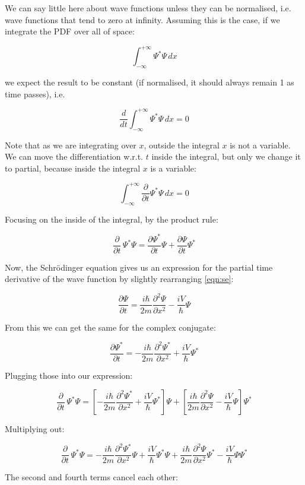 We can say little here about wave functions unless they can be normalised, i.e. wave functions that tend to zero at infinity. Assuming this is the case, if we integrate the PDF over all of space:

$$
\int_{-\infty}^{+\infty}
\Psi^*\Psi
\,dx
$$

we expect the result to be constant (if normalised, it should always remain 1 as time passes), i.e.

$$
\frac{d}{d t}
\int_{-\infty}^{+\infty}
\Psi^*\Psi
\,dx
= 0
$$

Note that as we are integrating over $x$, outside the integral $x$ is not a variable. We can move the differentiation w.r.t. $t$ inside the integral, but only we change it to partial, because inside the integral $x$ is a variable:

$$
\int_{-\infty}^{+\infty}
\frac{\partial}{\partial t}
\Psi^*\Psi
\,dx
= 0
$$

Focusing on the inside of the integral, by the product rule:

$$
\frac{\partial}{\partial t} \, \Psi^*\Psi
=
\frac{\partial \Psi^*}{\partial t} \Psi
+
\frac{\partial \Psi}{\partial t} \Psi^*
$$

Now, the Schrödinger equation gives us an expression for the partial time derivative of the wave function by slightly rearranging \eqref{eqn:se}:

$$
\frac{\partial \Psi}{\partial t}
=
\frac{i \hbar}{2m} \frac{\partial^2 \Psi}{\partial x^2}
- \frac{i V}{\hbar}{\Psi}
$$

From this we can get the same for the complex conjugate:

$$
\frac{\partial \Psi^*}{\partial t}
=
- \frac{i \hbar}{2m} \frac{\partial^2 \Psi^*}{\partial x^2}
+ \frac{i V}{\hbar}{\Psi^*}
$$

Plugging those into our expression:

$$
\frac{\partial}{\partial t} \, \Psi^*\Psi
=
\left[
- \frac{i \hbar}{2m} \frac{\partial^2 \Psi^*}{\partial x^2}
+ \frac{i V}{\hbar}\Psi^*
\right] \Psi
+
\left[
\frac{i \hbar}{2m} \frac{\partial^2 \Psi}{\partial x^2}
- \frac{i V}{\hbar}\Psi
\right] \Psi^*
$$

Multiplying out:

$$
\frac{\partial}{\partial t} \, \Psi^*\Psi
=
- \frac{i \hbar}{2m} \frac{\partial^2 \Psi^*}{\partial x^2}
\Psi
+ \frac{i V}{\hbar}\Psi^*\Psi
+
\frac{i \hbar}{2m} \frac{\partial^2 \Psi}{\partial x^2}
\Psi^*
- \frac{i V}{\hbar}\Psi\Psi^*
$$

The second and fourth terms cancel each other:

